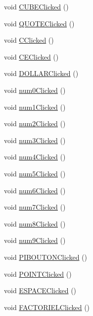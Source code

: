 \begin{DoxyCompactItemize}
\item 
void \hyperlink{class_main_window_a7e0ee20d8b3f6c4638ddced7d894c595}{\-C\-U\-B\-E\-Clicked} ()
\item 
void \hyperlink{class_main_window_aa3cc15e4ab21e8d1d02b2c908f7ed955}{\-Q\-U\-O\-T\-E\-Clicked} ()
\item 
void \hyperlink{class_main_window_acd5bbd32604f72b223e69a58088ddabd}{\-C\-Clicked} ()
\item 
void \hyperlink{class_main_window_a1a093a266d6f67c63e27b410de323e3f}{\-C\-E\-Clicked} ()
\item 
void \hyperlink{class_main_window_adc9d3f1638131c5d291c54380fda801f}{\-D\-O\-L\-L\-A\-R\-Clicked} ()
\item 
void \hyperlink{class_main_window_ab408f985cff16c7d939d48cfa3d5f0b1}{num0\-Clicked} ()
\item 
void \hyperlink{class_main_window_a538b702a2feed14f756f9fff0a53d2f5}{num1\-Clicked} ()
\item 
void \hyperlink{class_main_window_a857a81084ff261633c9896f24bdd6fb5}{num2\-Clicked} ()
\item 
void \hyperlink{class_main_window_aaf2e8e4cdcabb0c9cd2496e662038b64}{num3\-Clicked} ()
\item 
void \hyperlink{class_main_window_a6d79c0dc7b05f66d0dd2d5eb57d870a2}{num4\-Clicked} ()
\item 
void \hyperlink{class_main_window_a9dfa9a2ba4c04d27047f1b6cf50eb309}{num5\-Clicked} ()
\item 
void \hyperlink{class_main_window_ae581f160bb58ff7b92fb10488dad1cb7}{num6\-Clicked} ()
\item 
void \hyperlink{class_main_window_ae34dccd3c4bdff6452250ec4807977e4}{num7\-Clicked} ()
\item 
void \hyperlink{class_main_window_ab86f29d78da5c85373b2126cdbfadf78}{num8\-Clicked} ()
\item 
void \hyperlink{class_main_window_a48cd898abe91cf0b7784dfce7258b8f6}{num9\-Clicked} ()
\item 
void \hyperlink{class_main_window_a5c1743c01e8cf19b5b0e678a09734363}{\-P\-I\-B\-O\-U\-T\-O\-N\-Clicked} ()
\item 
void \hyperlink{class_main_window_a96f5509a262bda1ee40ceaddb081bff6}{\-P\-O\-I\-N\-T\-Clicked} ()
\item 
void \hyperlink{class_main_window_a4f3a33c651ac011d7a4ee62f70c88e44}{\-E\-S\-P\-A\-C\-E\-Clicked} ()
\item 
void \hyperlink{class_main_window_a97ac3886016cc9dc1cc7ae1be4abac65}{\-F\-A\-C\-T\-O\-R\-I\-E\-L\-Clicked} ()

\end{DoxyCompactItemize}
